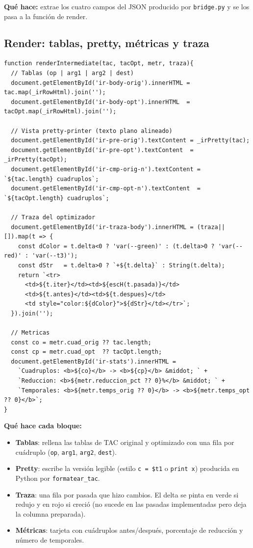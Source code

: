 \documentclass[11pt,a4paper]{article}
\begin{document}
\textbf{Qué hace:} extrae los cuatro campos del JSON producido por
\texttt{bridge.py} y se los pasa a la función de render.

\subsection{Render: tablas, pretty, métricas y traza}

\begin{lstlisting}[style=js]
function renderIntermediate(tac, tacOpt, metr, traza){
  // Tablas (op | arg1 | arg2 | dest)
  document.getElementById('ir-body-orig').innerHTML = tac.map(_irRowHtml).join('');
  document.getElementById('ir-body-opt').innerHTML  = tacOpt.map(_irRowHtml).join('');

  // Vista pretty-printer (texto plano alineado)
  document.getElementById('ir-pre-orig').textContent = _irPretty(tac);
  document.getElementById('ir-pre-opt').textContent  = _irPretty(tacOpt);
  document.getElementById('ir-cmp-orig-n').textContent = `${tac.length} cuadruplos`;
  document.getElementById('ir-cmp-opt-n').textContent  = `${tacOpt.length} cuadruplos`;

  // Traza del optimizador
  document.getElementById('ir-traza-body').innerHTML = (traza||[]).map(t => {
    const dColor = t.delta<0 ? 'var(--green)' : (t.delta>0 ? 'var(--red)' : 'var(--t3)');
    const dStr   = t.delta>0 ? `+${t.delta}` : String(t.delta);
    return `<tr>
      <td>${t.iter}</td><td>${escH(t.pasada)}</td>
      <td>${t.antes}</td><td>${t.despues}</td>
      <td style="color:${dColor}">${dStr}</td></tr>`;
  }).join('');

  // Metricas
  const co = metr.cuad_orig ?? tac.length;
  const cp = metr.cuad_opt  ?? tacOpt.length;
  document.getElementById('ir-stats').innerHTML =
    `Cuadruplos: <b>${co}</b> -> <b>${cp}</b> &middot; ` +
    `Reduccion: <b>${metr.reduccion_pct ?? 0}%</b> &middot; ` +
    `Temporales: <b>${metr.temps_orig ?? 0}</b> -> <b>${metr.temps_opt ?? 0}</b>`;
}
\end{lstlisting}

\textbf{Qué hace cada bloque:}
\begin{itemize}[leftmargin=*,nosep]
  \item \textbf{Tablas}: rellena las tablas de TAC original y optimizado
        con una fila por cuádruplo (\texttt{op}, \texttt{arg1},
        \texttt{arg2}, \texttt{dest}).
  \item \textbf{Pretty}: escribe la versión legible
        (estilo \texttt{c = \$t1} o \texttt{print x}) producida
        en Python por \texttt{formatear\_tac}.
  \item \textbf{Traza}: una fila por pasada que hizo cambios. El delta se
        pinta en verde si redujo y en rojo si creció (no sucede en las
        pasadas implementadas pero deja la columna preparada).
  \item \textbf{Métricas}: tarjeta con cuádruplos antes/después,
        porcentaje de reducción y número de temporales.
\end{itemize}
\end{document}
